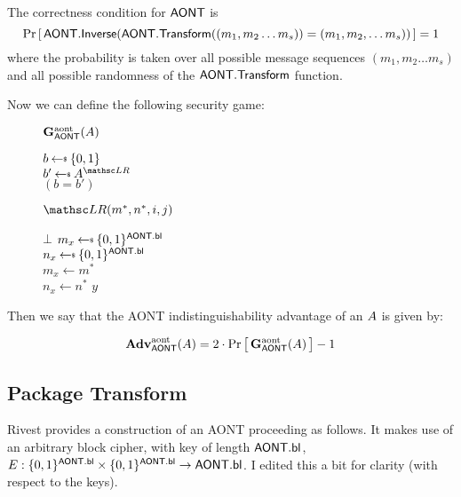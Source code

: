 \documentclass[11pt,twoside]{article}
\begin{document}
The correctness condition for $\mathsf{AONT}$ is $${\Pr\left[\,{\mathsf{AONT.Inverse}(\mathsf{AONT.Transform}((m_1,m_2\dots m_s))=(m_1,m_2,\dots m_s))}\,\right]} = 1$$ where the probability is taken over all possible message sequences $(m_1,m_2\dots m_s)$ and all possible randomness of the $\mathsf{AONT.Transform}$ function. 

Now we can define the following security game:

\begin{figure}[h]
{
\underline{$\mathbf{G}_{\mathsf{AONT}}^\text{aont}(A)$}

\begin{algorithm}[H]
$b \getsr \bits$\\
$b' \getsr \advA^{\LRO}$\\
\Return $(b=b')$
\end{algorithm}

\smallskip
\underline{$\LRO(m^*,n^*,i,j)$}

\begin{algorithm}[H]
{
\Return $\bot$
}
{
{
$m_x \getsr \bits^\schemefont{AONT.bl}$\\
$n_x \getsr \bits^\schemefont{AONT.bl}$\\

}
{
$m_x\gets m^*$\\
$n_x\gets n^*$
}
}
\Return $y$
\end{algorithm}
}
\end{figure}

\pagebreak

Then we say that the AONT indistinguishability advantage of an $A$ is given by: 

$$\textbf{Adv}^\text{aont}_{\mathsf{AONT}}(A)=2\cdot{\Pr\left[\,{\mathbf{G}_{\mathsf{AONT}}^\text{aont}(A)}\,\right]} - 1$$

\subsection{Package Transform}

Rivest provides a construction of an AONT proceeding as follows. It makes use of an arbitrary block cipher, with key of length $\mathsf{AONT.bl}$, $E : \{0,1\}^{\mathsf{AONT.bl}} \times \{0,1\}^{\mathsf{AONT.bl}}\rightarrow \mathsf{AONT.bl}$. I edited this a bit for clarity (with respect to the keys). 
\end{document}
